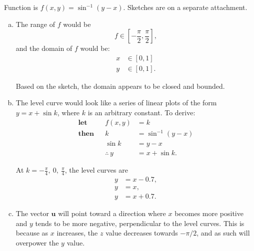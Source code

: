 \documentclass[12pt,a4paper]{article}
\begin{document}
    \begin{answer}
        Function is \(f(x,y) = \sin^{-1}(y-x)\). Sketches are on a separate attachment.
        \begin{enumerate}[(a)]
            \item The range of \(f\) would be \[f \in \left[-\frac{\pi}{2}, \frac{\pi}{2} \right],\] and the domain of \(f\) would be:
            \begin{align*}
                x &\in [0,1] \\
                y &\in [0,1].
            \end{align*}

            Based on the sketch, the domain appears to be closed and bounded.

            \item The level curve would look like a series of linear plots of the form \(y = x + \sin{}k\), where \(k\) is an arbitrary constant. To derive:
            \begin{align*}
                \textbf{let} &&  f(x,y) &= k \\
                \textbf{then} && k &= \sin^{-1} (y - x) \\
                && \sin{}k &= y - x \\
                && \therefore \, y &= x + \sin{}k.
            \end{align*}

            At \(k = -\frac{\pi}{4}, \ 0, \ \frac{\pi}{4}\), the level curves are
            \begin{align*}
                y &= x - 0.7, \\
                y &= x, \\
                y &= x + 0.7.
            \end{align*}
            
            \item The vector \(\mathbf{u}\) will point toward a direction where \(x\) becomes more positive and \(y\) tends to be more negative, perpendicular to the level curves. This is because as \(x\) increases, the \(z\) value decreases towards \(-\pi/2\), and as such will overpower the \(y\) value.
        \end{enumerate}
    \end{answer}
\end{document}
